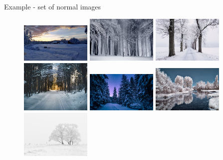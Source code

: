\documentclass[xcolor=pdftex,dvipsnames,table,mathserif]{beamer}
\begin{document}
\begin{frame}{Example - set of normal images}

\begin{figure}[ht]
  \centering
  \includegraphics[width=0.3\textwidth]{snow1-pexels-photo-290548.jpg}
  \includegraphics[width=0.3\textwidth]{snow2-pexels-photo-235621.jpg}
  \includegraphics[width=0.3\textwidth]{snow3-pexels-photo-839462.jpeg}
  \includegraphics[width=0.3\textwidth]{snow4-pexels-photo-688660.jpeg}
  \includegraphics[width=0.3\textwidth]{snow5-pexels-photo-773594.jpeg}
  \includegraphics[width=0.3\textwidth]{snow6-pexels-photo-1559117.jpeg}
  \includegraphics[width=0.3\textwidth]{snow7-pexels-photo-66284.jpeg}

\end{figure}
\end{frame}
\end{document}
